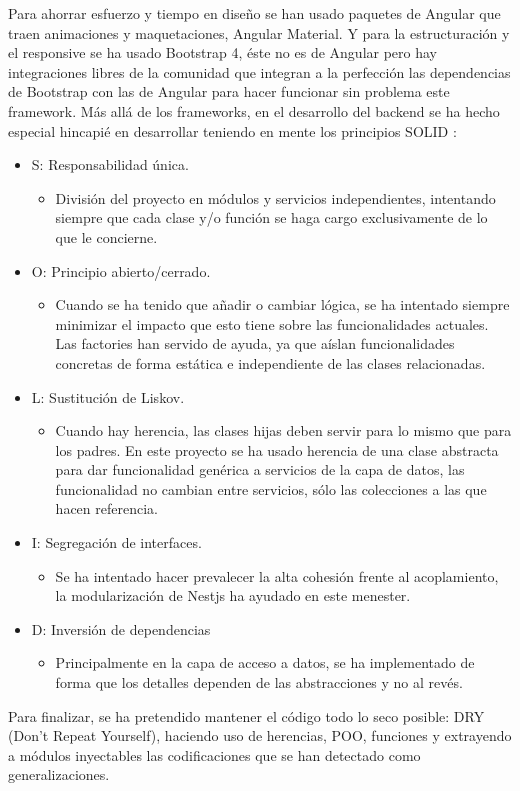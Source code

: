 \par Para ahorrar esfuerzo y tiempo en diseño se han usado paquetes de Angular que traen animaciones y maquetaciones, Angular Material. Y para la estructuración y el responsive se ha usado Bootstrap 4, éste no es de Angular pero hay integraciones libres de la comunidad que integran a la perfección las dependencias de Bootstrap con las de Angular para hacer funcionar sin problema este framework.
\clearpage
Más allá de los frameworks, en el desarrollo del backend se ha hecho especial hincapié en desarrollar teniendo en mente los principios SOLID \citep{SOLID}:
\begin{itemize}
    \item S: Responsabilidad única.
    \begin{itemize}
        \item División del proyecto en módulos y servicios independientes, intentando siempre que cada clase y/o función se haga cargo exclusivamente de lo que le concierne.
    \end{itemize}
    \item O: Principio abierto/cerrado.
    \begin{itemize}
        \item Cuando se ha tenido que añadir o cambiar lógica, se ha intentado siempre minimizar el impacto que esto tiene sobre las funcionalidades actuales. Las factories han servido de ayuda, ya que aíslan funcionalidades concretas de forma estática e independiente de las clases relacionadas. 
    \end{itemize}
    \item L: Sustitución de Liskov.
    \begin{itemize}
        \item Cuando hay herencia, las clases hijas deben servir para lo mismo que para los padres. En este proyecto se ha usado herencia de una clase abstracta para dar funcionalidad genérica a servicios de la capa de datos, las funcionalidad no cambian entre servicios, sólo las colecciones a las que hacen referencia.
    \end{itemize}
    \item I: Segregación de interfaces.
    \begin{itemize}
        \item Se ha intentado hacer prevalecer la alta cohesión frente al acoplamiento, la modularización de Nestjs ha ayudado en este menester.
    \end{itemize}
    \item D: Inversión de dependencias
    \begin{itemize}
        \item Principalmente en la capa de acceso a datos, se ha implementado de forma que los detalles dependen de las abstracciones y no al revés.
    \end{itemize}
\end{itemize}
\vspace{1em}
\par Para finalizar, se ha pretendido mantener el código todo lo seco posible: DRY (Don't Repeat Yourself), haciendo uso de herencias, POO, funciones y extrayendo a módulos inyectables las codificaciones que se han detectado como generalizaciones.

